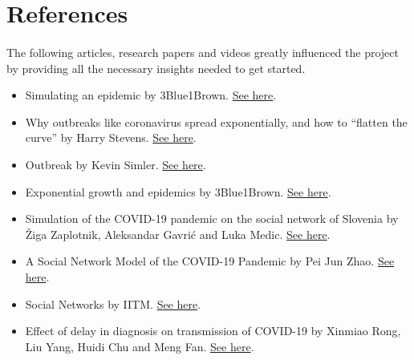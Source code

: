 \documentclass[14pt, a4paper]{extarticle}
\begin{document}
	\newpage
	\section{References}
	    \paragraph{} The following articles, research papers and videos greatly influenced the project by providing all the necessary insights needed to get started.
    	
        \begin{itemize}
            \item Simulating an epidemic by 3Blue1Brown. \href{https://www.youtube.com/watch?v=gxAaO2rsdIs}{See here}.
            
            \item Why outbreaks like coronavirus spread exponentially, and how to “flatten the curve” by Harry Stevens. \href{https://www.washingtonpost.com/graphics/2020/world/corona-simulator/}{See here}.
            
            \item Outbreak by Kevin Simler. \href{https://meltingasphalt.com/interactive/outbreak/}{See here}.
            
            \item Exponential growth and epidemics by 3Blue1Brown. \href{https://www.youtube.com/watch?v=Kas0tIxDvrg}{See here}.
            
            \item Simulation of the COVID-19 pandemic on the social network of Slovenia by Žiga Zaplotnik, Aleksandar Gavrić and Luka Medic. \href{https://journals.plos.org/plosone/article?id=10.1371/journal.pone.0238090}{See here}.
            
            \item A Social Network Model of the COVID-19 Pandemic by Pei Jun Zhao. \href{https://www.medrxiv.org/content/10.1101/2020.03.23.20041798v1.full-text}{See here}.
            
            \item Social Networks by IITM. \href{https://www.youtube.com/playlist?list=PLyqSpQzTE6M8CLBcLnq-f3vHRH-klC39L}{See here}.
            
            \item Effect of delay in diagnosis on transmission of COVID-19 by Xinmiao Rong, Liu Yang, Huidi Chu and Meng Fan. \href{http://www.aimspress.com/article/10.3934/mbe.2020149}{See here}.
        \end{itemize}
	
\end{document}
